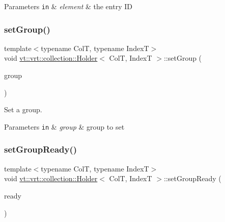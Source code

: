 \begin{DoxyParams}[1]{Parameters}
\mbox{\tt in}  & {\em element} & the entry ID \\
\hline
\end{DoxyParams}
\mbox{\label{structvt_1_1vrt_1_1collection_1_1_holder_ad1004d701690d7de8d323de1d5bc1a29}} 
\subsubsection{\texorpdfstring{set\+Group()}{setGroup()}}
{\footnotesize\ttfamily template$<$typename ColT, typename IndexT$>$ \\
void \hyperlink{structvt_1_1vrt_1_1collection_1_1_holder}{vt\+::vrt\+::collection\+::\+Holder}$<$ ColT, IndexT $>$\+::set\+Group (\begin{DoxyParamCaption}\item[{\hyperlink{namespacevt_a27b5e4411c9b6140c49100e050e2f743}{Group\+Type} const \&}]{group }\end{DoxyParamCaption})\hspace{0.3cm}{\ttfamily [inline]}}



Set a group. 


\begin{DoxyParams}[1]{Parameters}
\mbox{\tt in}  & {\em group} & group to set \\
\hline
\end{DoxyParams}
\mbox{\label{structvt_1_1vrt_1_1collection_1_1_holder_aa666f9e2960605203d325fd39de82dd7}} 
\subsubsection{\texorpdfstring{set\+Group\+Ready()}{setGroupReady()}}
{\footnotesize\ttfamily template$<$typename ColT, typename IndexT$>$ \\
void \hyperlink{structvt_1_1vrt_1_1collection_1_1_holder}{vt\+::vrt\+::collection\+::\+Holder}$<$ ColT, IndexT $>$\+::set\+Group\+Ready (\begin{DoxyParamCaption}\item[{bool const}]{ready }\end{DoxyParamCaption})\hspace{0.3cm}{\ttfamily [inline]}}



